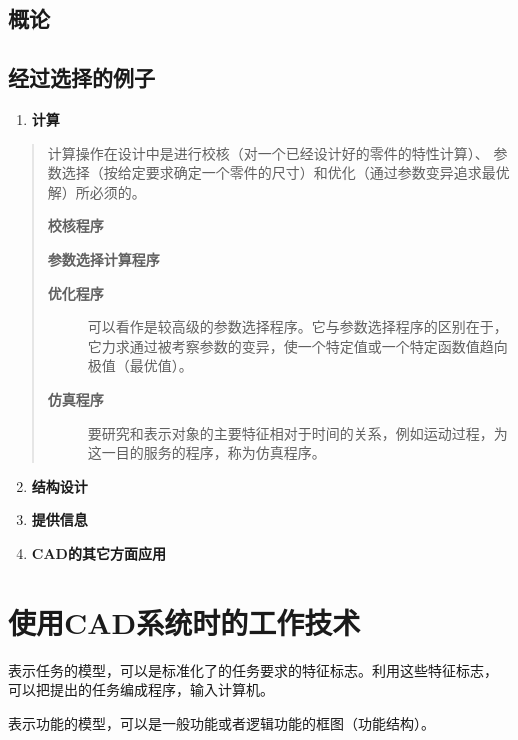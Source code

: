 \documentclass[letterpaper,10pt,english]{sphinxmanual}
\begin{document}
\subsection{概论}
\label{unit10:id7}

\subsection{经过选择的例子}
\label{unit10:id8}\begin{enumerate}
\item {} 
\textbf{计算}

\end{enumerate}
\begin{quote}

计算操作在设计中是进行校核（对一个已经设计好的零件的特性计算）、
参数选择（按给定要求确定一个零件的尺寸）和优化（通过参数变异追求最优解）所必须的。

\textbf{校核程序}

\textbf{参数选择计算程序}
\begin{description}
\item[{\textbf{优化程序}}] \leavevmode
可以看作是较高级的参数选择程序。它与参数选择程序的区别在于，它力求通过被考察参数的变异，使一个特定值或一个特定函数值趋向极值（最优值）。

\item[{\textbf{仿真程序}}] \leavevmode
要研究和表示对象的主要特征相对于时间的关系，例如运动过程，为这一目的服务的程序，称为仿真程序。

\end{description}
\end{quote}
\begin{enumerate}
\setcounter{enumi}{1}
\item {} 
\textbf{结构设计}

\item {} 
\textbf{提供信息}

\item {} 
\textbf{CAD的其它方面应用}

\end{enumerate}


\section{使用CAD系统时的工作技术}
\label{unit10:id9}
表示任务的模型，可以是标准化了的任务要求的特征标志。利用这些特征标志，
可以把提出的任务编成程序，输入计算机。

表示功能的模型，可以是一般功能或者逻辑功能的框图（功能结构）。
\end{document}
